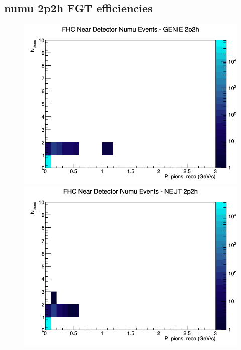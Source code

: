 \documentclass[12pt]{article}
\begin{document}
\subsection{numu 2p2h FGT efficiencies}
\begin{figure}[h]
\includegraphics[width=\linewidth]{eff_N_P/FGT/pions/2p2h_FHC_ND_numu_N_P_GENIE.png}
\endminipage
{}
\includegraphics[width=\linewidth]{eff_N_P/FGT/pions/2p2h_FHC_ND_numu_N_P_NEUT.png}
\endminipage
{}

\end{figure}
\end{document}
